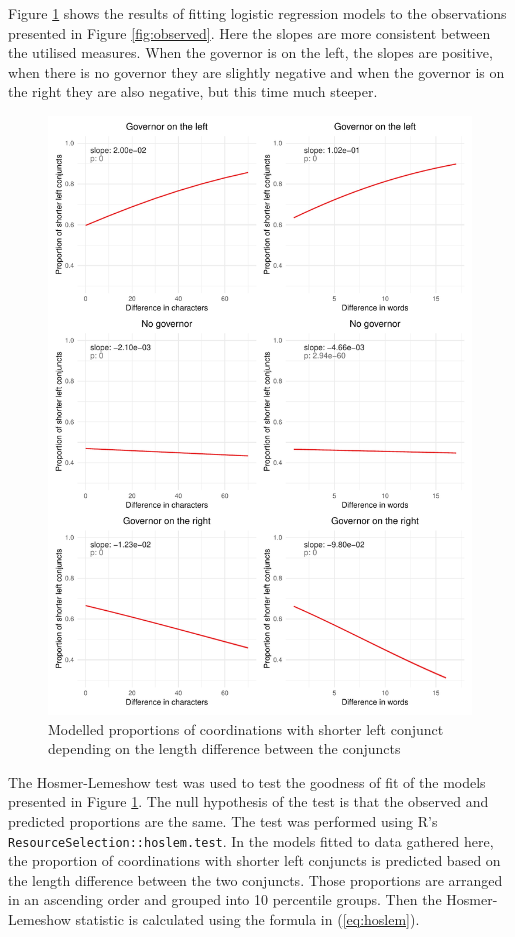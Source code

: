 Figure \ref{fig:logit} shows the results of fitting logistic regression models to the observations presented in Figure \ref{fig:observed}. Here the slopes are more consistent between the utilised measures. When the governor is on the left, the slopes are positive, when there is no governor they are slightly negative and when the governor is on the right they are also negative, but this time much steeper. 

\begin{figure}[hbt!]
    \includegraphics[width=\textwidth]{inputs/modelled.pdf}
    \caption{\centering Modelled proportions of coordinations with shorter left conjunct depending on the length difference between the conjuncts}\label{fig:logit}
\end{figure}

The Hosmer-Lemeshow test \citep{hoslem} was used to test the goodness of fit of the models presented in Figure \ref{fig:logit}.
The null hypothesis of the test is that the observed and predicted proportions are the same. The test was performed using R's \texttt{ResourceSelection::hoslem.test}. In the models fitted to data gathered here, the proportion of coordinations with shorter left conjuncts is predicted based on the length difference between the two conjuncts. Those proportions are arranged in an ascending order and grouped into 10 percentile groups. Then the Hosmer-Lemeshow statistic is calculated using the formula in (\ref{eq:hoslem}). 

